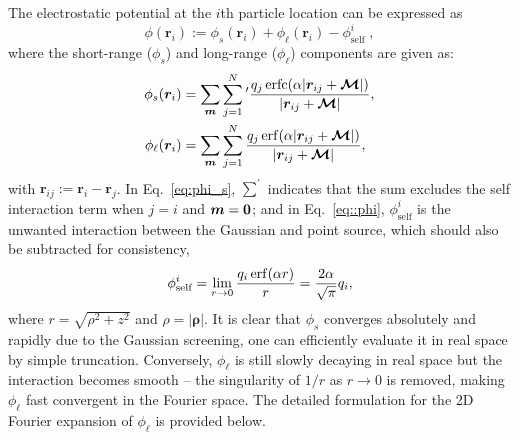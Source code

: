 The electrostatic potential at the $i$th particle location can be expressed as 
\begin{equation}\label{eq::phi}
	\phi(\bm{r}_{i}) :=\phi_{s}(\bm{r}_{i}) + \phi_{\ell}(\bm{r}_{i}) - \phi_{\text{self}}^{i}\;,
\end{equation}           
where the short-range ($\phi_{s}$) and long-range ($\phi_{\ell}$) components are given as:
\begin{align}
	\phi_{s}(\bm{r}_{i}) &= \sum_{\boldsymbol{m}} \sum_{j=1}^N {}^\prime \frac{q_{j} \operatorname{erfc} (\alpha \lvert\boldsymbol{r}_{ij} + \boldsymbol{\mathcal{M}}\rvert)}{\lvert\boldsymbol{r}_{ij} + \boldsymbol{\mathcal{M}}\rvert}, \label{eq:phi_s} \\
	\phi_{\ell}(\bm{r}_{i}) &= \sum_{\boldsymbol{m}} \sum_{j=1}^N  \frac{q_{j} \operatorname{erf} (\alpha \lvert\boldsymbol{r}_{ij} + \boldsymbol{\mathcal{M}}\rvert)}{\lvert\boldsymbol{r}_{ij} + \boldsymbol{\mathcal{M}}\rvert},\label{eq:phi_l}
\end{align}
with $\bm{r}_{ij}:=\bm{r}_{i}-\bm{r}_{j}$.
In Eq.~\eqref{eq:phi_s}, $\sum^\prime$ indicates that the sum excludes the self interaction term when $j=i$ and $\boldsymbol{m}=\boldsymbol{0}$; and in Eq.~\eqref{eq::phi}, $\phi_{\text{self}}^{i}$ is the unwanted interaction between the Gaussian and point source, which should also be subtracted for consistency,
\begin{equation}\label{eq::self}
	\phi_{\text{self}}^{i}=\lim_{r\rightarrow 0}\frac{q_{i} \operatorname{erf} (\alpha r)}{r}=\frac{2\alpha }{\sqrt{\pi}}q_{i},
\end{equation}
where $r=\sqrt{\rho^2+z^2}$ and $\rho=|\bm{\rho}|$. It is clear that $\phi_{s}$ converges absolutely and rapidly due to the Gaussian screening, one can efficiently evaluate it in real space by simple truncation. 
Conversely, $\phi_{\ell}$ is still slowly decaying in real space but the interaction becomes smooth -- the singularity of $1/r$ as $r\rightarrow 0$ is removed, making  $\phi_{\ell}$ fast convergent in the Fourier space. 
The detailed formulation for the 2D Fourier expansion of $\phi_{\ell}$ is provided below.


